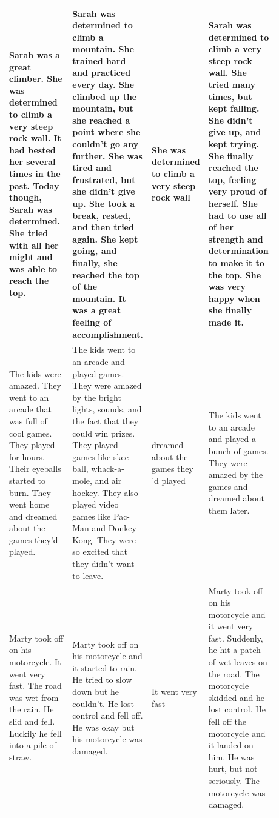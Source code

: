 \begin{table}[htp!]
\begin{tabular}{|p{0.24\linewidth}|p{0.26\linewidth}|p{0.12\linewidth}|p{0.26\linewidth}|}
Sarah was a great climber. She was determined to climb a very steep rock wall. It had bested her several times in the past. Today though, Sarah was determined. She tried with all her might and was able to reach the top.
& Sarah was determined to climb a mountain. She trained hard and practiced every day. She climbed up the mountain, but she reached a point where she couldn't go any further. She was tired and frustrated, but she didn't give up. She took a break, rested, and then tried again. She kept going, and finally, she reached the top of the mountain. It was a great feeling of accomplishment.
& She was determined to climb a very steep rock wall
& Sarah was determined to climb a very steep rock wall. She tried many times, but kept falling. She didn't give up, and kept trying. She finally reached the top, feeling very proud of herself. She had to use all of her strength and determination to make it to the top. She was very happy when she finally made it. \\ \hline

The kids were amazed. They went to an arcade that was full of cool games. They played for hours. Their eyeballs started to burn. They went home and dreamed about the games they'd played.
& The kids went to an arcade and played games. They were amazed by the bright lights, sounds, and the fact that they could win prizes. They played games like skee ball, whack-a-mole, and air hockey. They also played video games like Pac-Man and Donkey Kong. They were so excited that they didn't want to leave.
& dreamed about the games they 'd played
& The kids went to an arcade and played a bunch of games. They were amazed by the games and dreamed about them later. \\ \hline

Marty took off on his motorcycle. It went very fast. The road was wet from the rain. He slid and fell. Luckily he fell into a pile of straw.
& Marty took off on his motorcycle and it started to rain. He tried to slow down but he couldn't. He lost control and fell off. He was okay but his motorcycle was damaged.
& It went very fast
& Marty took off on his motorcycle and it went very fast. Suddenly, he hit a patch of wet leaves on the road. The motorcycle skidded and he lost control. He fell off the motorcycle and it landed on him. He was hurt, but not seriously. The motorcycle was damaged. \\ \hline


\end{tabular}
\end{table}
